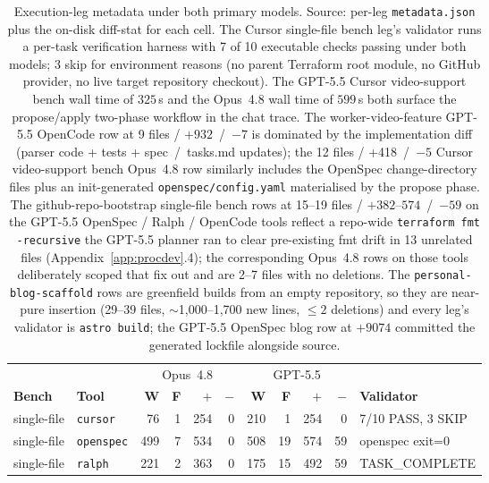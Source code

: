\begin{table}[h]
\centering
\caption{Execution-leg metadata under both primary models. Source:
per-leg \texttt{metadata.json} plus the on-disk diff-stat for each
cell. The Cursor single-file bench leg's validator runs a per-task
verification harness with 7 of 10 executable checks passing under both
models; 3 skip for environment reasons (no parent Terraform root
module, no GitHub provider, no live target repository checkout). The
GPT-5.5 Cursor video-support bench wall time of $325$\,s and the
Opus~4.8 wall time of $599$\,s both surface the propose/apply
two-phase workflow in the chat trace. The
worker-video-feature GPT-5.5 OpenCode row at 9 files /
$+932$~/~$-7$ is dominated by the implementation diff (parser code +
tests + spec~/~tasks.md updates); the 12 files / +418~/~$-5$ Cursor
video-support bench Opus~4.8 row similarly includes the OpenSpec
change-directory files plus an init-generated
\texttt{openspec/config.yaml} materialised by the propose phase. The
github-repo-bootstrap single-file bench rows at 15--19 files /
$+382$--$574$~/~$-59$ on the GPT-5.5 OpenSpec / Ralph /
OpenCode tools reflect a repo-wide \texttt{terraform fmt -recursive}
the GPT-5.5 planner ran to clear pre-existing fmt drift in 13
unrelated files (Appendix~\ref{app:procdev}.4); the
corresponding Opus~4.8 rows on those tools deliberately scoped that
fix out and are 2--7 files with no deletions. The
\texttt{personal-blog-scaffold} rows are greenfield builds from an
empty repository, so they are near-pure insertion (29--39 files,
$\sim$1{,}000--1{,}700 new lines, $\leq 2$ deletions) and every leg's
validator is \texttt{astro build}; the GPT-5.5 OpenSpec blog
row at $+9074$ committed the generated lockfile alongside source.}
\label{tab:metadata-exec}
\small
\setlength{\tabcolsep}{3pt}
\begin{tabular}{ll rrrr rrrr l}
\toprule
 & & \multicolumn{4}{c}{Opus~4.8} & \multicolumn{4}{c}{GPT-5.5} & \\
 \cmidrule(lr){3-6} \cmidrule(lr){7-10}
\textbf{Bench} & \textbf{Tool} & \textbf{W} & \textbf{F} & \textbf{$+$} & \textbf{$-$} & \textbf{W} & \textbf{F} & \textbf{$+$} & \textbf{$-$} & \textbf{Validator} \\
\midrule
single-file   & \texttt{cursor}     &   76 & 1  & 254 & 0 &  210 &  1 & 254 &  0 & 7/10 PASS, 3 SKIP    \\
single-file   & \texttt{openspec}   &  499 & 7  & 534 & 0 &  508 & 19 & 574 & 59 & openspec exit=0      \\
single-file   & \texttt{ralph}      &  221 & 2  & 363 & 0 &  175 & 15 & 492 & 59 & TASK\_COMPLETE       \\

\end{tabular}
\end{table}
